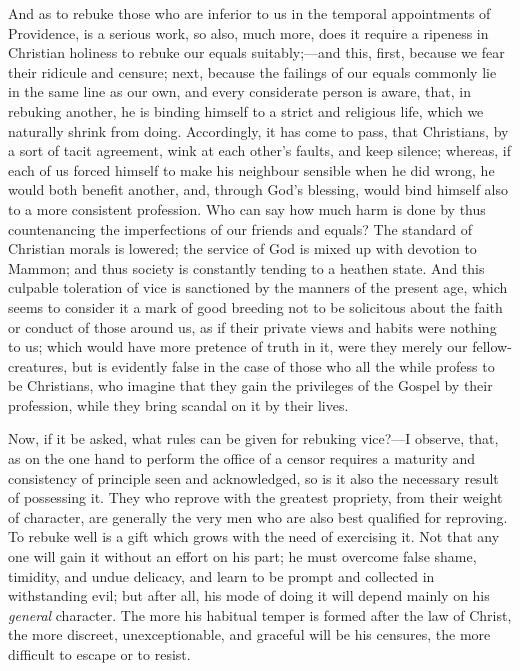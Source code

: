 And as to rebuke those who are inferior to us in the temporal
appointments of Providence, is a serious work, so also, much more, does
it require a ripeness in Christian holiness to rebuke our equals
suitably;—and this, first, because we fear their ridicule and censure;
next, because the failings of our equals commonly lie in the same line
as our own, and every considerate person is aware, that, in rebuking
another, he is binding himself to a strict and religious life, which we
naturally shrink from doing. Accordingly, it has come to pass, that
Christians, by a sort of tacit agreement, wink at each other's faults,
and keep silence; whereas, if each of us forced himself to make his
neighbour sensible when he did wrong, he would both benefit another,
and, through God's blessing, would bind himself also to a more
consistent profession. Who can say how much harm is done by thus
countenancing the imperfections of our friends and equals? The standard
of Christian morals is lowered; the service of God is mixed up with
devotion to Mammon; and thus society is constantly tending to a heathen
state. And this culpable toleration of vice is sanctioned by the manners
of the present age, which seems to consider it a mark of good breeding
not to be solicitous about the faith or conduct of those around us, as
if their private views and habits were nothing to us; which would have
more pretence of truth in it, were they merely our fellow-creatures, but
is evidently false in the case of those who all the while profess to be
Christians, who imagine that they gain the privileges of the Gospel by
their profession, while they bring scandal on it by their lives.

Now, if it be asked, what rules can be given for rebuking vice?—I
observe, that, as on the one hand to perform the office of a censor
requires a maturity and consistency of principle seen and acknowledged,
so is it also the necessary result of possessing it. They who reprove
with the greatest propriety, from their weight of character, are
generally the very men who are also best qualified for reproving. To
rebuke well is a gift which grows with the need of exercising it. Not
that any one will gain it without an effort on his part; he must
overcome false shame, timidity, and undue delicacy, and learn to be
prompt and collected in withstanding evil; but after all, his mode of
doing it will depend mainly on his \emph{general} character. The more
his habitual temper is formed after the law of Christ, the more
discreet, unexceptionable, and graceful will be his censures, the more
difficult to escape or to resist.

